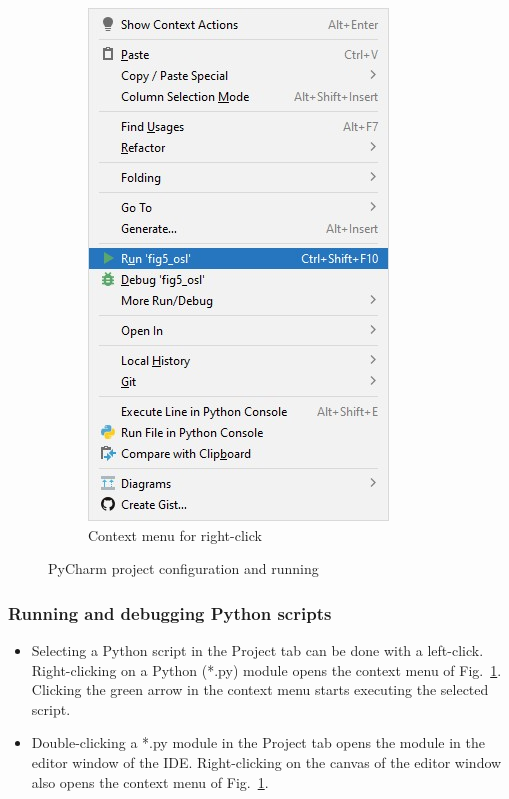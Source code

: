\begin{figure}[H]
\begin{subfigure}[b]{0.3\textwidth}
		\includegraphics[width=\textwidth]{Figures/run.jpg}
		\caption{Context menu for right-click}
		\label{fig:pycharm_run}
	\end{subfigure}
	\caption{PyCharm project configuration and running}
	\label{fig:pycharm_config}
\end{figure}

\subsubsection{Running and debugging Python scripts}

\begin{itemize}
	\item Selecting a Python script in the Project tab can be done with a left-click. Right-clicking on a Python (*.py) module opens the context menu of Fig.~\ref{fig:pycharm_run}. Clicking the green arrow in the context menu starts executing the selected script.
	\item Double-clicking a *.py module in the Project tab opens the module in the editor window of the IDE. Right-clicking on the canvas of the editor window also opens the context menu of Fig.~\ref{fig:pycharm_run}.
\end{itemize}

\newpage